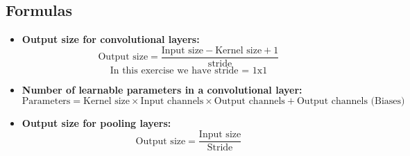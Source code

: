 \documentclass[a4paper,12pt]{article}
\begin{document}
\subsection*{Formulas}
\begin{itemize}
    \item \textbf{Output size for convolutional layers:}
    \[
    \text{Output size} = \frac{\text{Input size} - \text{Kernel size} + 1}{\text{stride}}
    \]
    \[
    \text{In this exercise we have stride = 1x1}
    \]
    \item \textbf{Number of learnable parameters in a convolutional layer:}
    \[
    \text{Parameters} = \text{Kernel size} \times \text{Input channels} \times \text{Output channels} + \text{Output channels (Biases)}
    \]
    \item \textbf{Output size for pooling layers:}
    \[
    \text{Output size} = \frac{\text{Input size}}{\text{Stride}}
    \]
\end{itemize}



\end{document}
